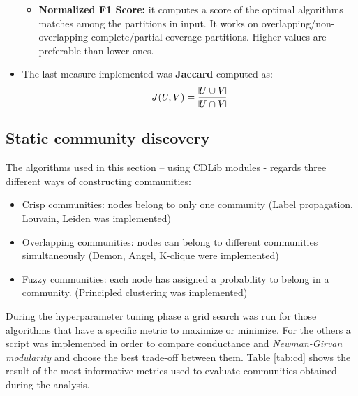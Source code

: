 \documentclass[sigchi]{acmart}
\begin{document}
\begin{itemize}
\begin{itemize}
        \item \textbf{Normalized F1 Score:} it computes a score of the optimal algorithms matches among the partitions in input. It works on overlapping/non-overlapping complete/partial coverage partitions. Higher values are preferable than lower ones\cite{inproceedings}. 
    \end{itemize}    
    \item The last measure implemented was \textbf{Jaccard} computed as: 
    \begin{equation}
        J(U,V)=\frac{\vline U \cup V \vline}{\vline U \cap V\vline}
    \end{equation}
\end{itemize}

\subsection{Static community discovery}
The algorithms used in this section – using CDLib\cite{cdlib} modules - regards three different ways of constructing communities:
\begin{itemize}
    \item Crisp communities: nodes belong to only one community (Label propagation\cite{Raghavan_2007}, Louvain\cite{Blondel_2008}, Leiden\cite{louvain} was implemented)
    \item Overlapping communities: nodes can belong to different communities simultaneously   (Demon\cite{demon}, Angel\cite{angel}, K-clique were implemented)
    \item Fuzzy communities: each node has assigned a probability to belong in a community. (Principled clustering was implemented)
\end{itemize}

During the hyperparameter tuning phase a grid search was run for those algorithms that have a specific metric to maximize or minimize. For the others a script was implemented in order to compare conductance and \textit{Newman-Girvan modularity} and choose the best trade-off between them. Table \ref{tab:cd} shows the result of the most informative metrics used to evaluate communities obtained during the analysis.
\end{document}
